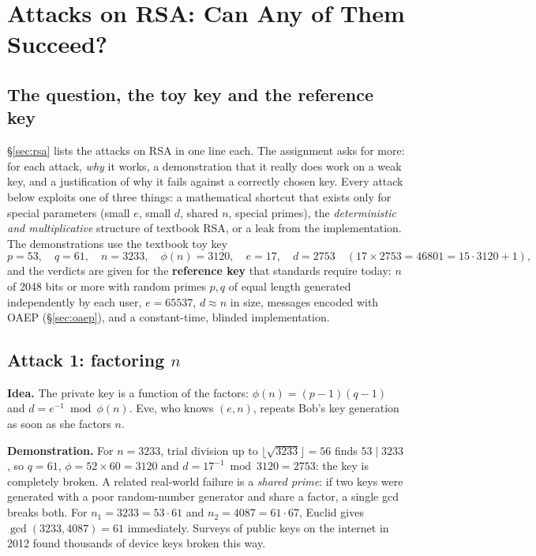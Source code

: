 \section{Attacks on RSA: Can Any of Them Succeed?}\label{sec:rsaattacks}

\subsection{The question, the toy key and the reference key \new}

\S\ref{sec:rsa} lists the attacks on RSA in one line each. The assignment asks for more: for each attack, \emph{why} it works, a demonstration that it really does work on a weak key, and a justification of why it fails against a correctly chosen key. Every attack below exploits one of three things: a mathematical shortcut that exists only for special parameters (small $e$, small $d$, shared $n$, special primes), the \emph{deterministic and multiplicative} structure of textbook RSA, or a leak from the implementation. The demonstrations use the textbook toy key
\[
p = 53,\quad q = 61,\quad n = 3233,\quad \phi(n) = 3120,\quad e = 17,\quad d = 2753 \quad (17 \times 2753 = 46801 = 15 \cdot 3120 + 1),
\]
and the verdicts are given for the \textbf{reference key} that standards require today: $n$ of 2048 bits or more with random primes $p, q$ of equal length generated independently by each user, $e = 65537$, $d \approx n$ in size, messages encoded with OAEP (\S\ref{sec:oaep}), and a constant-time, blinded implementation.

\subsection{Attack 1: factoring $n$}
\textbf{Idea.} The private key is a function of the factors: $\phi(n) = (p - 1)(q - 1)$ and $d = e^{-1} \bmod \phi(n)$. Eve, who knows $(e, n)$, repeats Bob's key generation as soon as she factors $n$.

\textbf{Demonstration.} For $n = 3233$, trial division up to $\lfloor\sqrt{3233}\rfloor = 56$ finds $53 \mid 3233$, so $q = 61$, $\phi = 52 \times 60 = 3120$ and $d = 17^{-1} \bmod 3120 = 2753$: the key is completely broken. A related real-world failure is a \emph{shared prime}: if two keys were generated with a poor random-number generator and share a factor, a single gcd breaks both. For $n_1 = 3233 = 53 \cdot 61$ and $n_2 = 4087 = 61 \cdot 67$, Euclid gives $\gcd(3233, 4087) = 61$ immediately. Surveys of public keys on the internet in 2012 found thousands of device keys broken this way.

